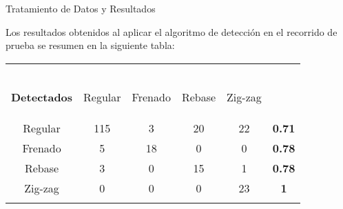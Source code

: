 \documentclass[14pt]{beamer}
\begin{document}
\begin{frame}{Tratamiento de Datos y Resultados}

Los resultados obtenidos al aplicar el algoritmo de detección en el recorrido de prueba se resumen en la siguiente tabla:

\begin{table}[H]
\centering
\begin{tabular}{||c|c|c|c|c||c||}
\hhline{|t:=====:t:=:t|}
\backslashbox{\bf \small Ejecutado\\ \\ }{\\ \bf \small Detectados} & \begin{sideways}\hspace{-0.7cm}\small Regular\end{sideways} & \begin{sideways}\hspace{-0.7cm}\small Frenado\end{sideways} & \begin{sideways}\hspace{-0.7cm}\small Rebase\end{sideways} & \begin{sideways}\hspace{-0.7cm}\small Zig-zag\end{sideways} & \begin{sideways}\hspace{-0.7cm}{\bf \small Eficiencia}\end{sideways} \\ 
\hhline{||-----||-||}
\small Regular &\small 115 &\small 3 &\small 20 &\small 22 & \bf \small 0.71 \\ 
\hhline{||-----||-||}
\small Frenado &\small 5 &\small 18 &\small 0 &\small 0 & \bf \small 0.78 \\ 
\hhline{||-----||-||}
\small Rebase &\small 3 &\small 0 &\small 15 &\small 1 & \bf \small 0.78 \\ 
\hhline{||-----||-||}
\small Zig-zag &\small 0 &\small 0 &\small 0 &\small 23 & \bf \small 1 \\ 
\hhline{|b:=====:b:=:b|}
\end{tabular}
\end{table}

\end{frame}



\end{document}

